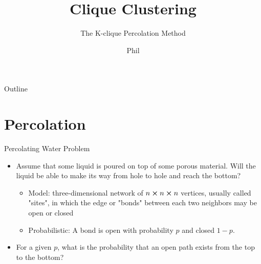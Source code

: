 \documentclass[aspectratio=169, handout]{beamer}
\title{Clique Clustering}
\subtitle{The K-clique Percolation Method}
\author{Phil}
\begin{document}

\begin{frame}
\titlepage
\end{frame}

\date{}

\begin{frame}{Outline}
  \tableofcontents
\end{frame}

\section{Percolation}
\frame{\sectionpage}
\begin{frame}{Percolating Water Problem}
\begin{itemize}
    \item Assume that some liquid is poured on top of some porous material. Will the liquid be able to make its way from hole to hole and reach the bottom?
    \begin{itemize}
        \pause
        \item \textcolor{sigma@mainblue}{Model:} three-dimensional network of $n \cross n \cross n$ vertices, usually called "sites", in which the edge or "bonds" between each two neighbors may be open or closed
        \pause
        \item \textcolor{sigma@mainblue}{Probabilistic:} A bond is open with probability $p$ and closed $1-p$.
    \end{itemize}
    \pause
    \item For a given $p$, what is the probability that an open path exists from the top to the bottom?
\end{itemize}
\end{frame}
\end{document}
